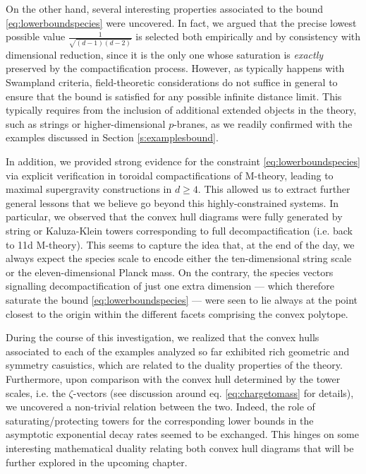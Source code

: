 On the other hand, several interesting properties associated to the bound \eqref{eq:lowerboundspecies} were uncovered. In fact, we argued that the precise lowest possible value $ \frac{1}{\sqrt{(d-1)(d-2)}}$ is selected both empirically and by consistency with dimensional reduction, since it is the only one whose saturation is \emph{exactly} preserved by the compactification process. However, as typically happens with Swampland criteria, field-theoretic considerations do not suffice in general to ensure that the bound is satisfied for any possible infinite distance limit. This typically requires from the inclusion of additional extended objects in the theory, such as strings or higher-dimensional $p$-branes, as we readily confirmed with the examples discussed in Section \ref{s:examplesbound}.

In addition, we provided strong evidence for the constraint \eqref{eq:lowerboundspecies} via explicit verification in toroidal compactifications of M-theory, leading to maximal supergravity constructions in $d \geq 4$. This allowed us to extract further general lessons that we believe go beyond this highly-constrained systems. In particular, we observed that the convex hull diagrams were fully generated by string or Kaluza-Klein towers corresponding to full decompactification (i.e. back to 11d M-theory). This seems to capture the idea that, at the end of the day, we always expect the species scale to encode either the ten-dimensional string scale or the eleven-dimensional Planck mass. On the contrary, the species vectors signalling decompactification of just one extra dimension --- which therefore saturate the bound \eqref{eq:lowerboundspecies} --- were seen to lie always at the point closest to the origin within the different facets comprising the convex polytope. 

During the course of this investigation, we realized that the convex hulls associated to each of the examples analyzed so far exhibited rich geometric and symmetry casuistics, which are related to the duality properties of the theory. Furthermore, upon comparison with the convex hull determined by the tower scales, i.e. the $\zeta$-vectors (see discussion around eq. \eqref{eq:chargetomass} for details), we uncovered a non-trivial relation between the two. Indeed, the role of saturating/protecting towers for the corresponding lower bounds in the asymptotic exponential decay rates seemed to be exchanged. This hinges on some interesting mathematical duality relating both convex hull diagrams that will be further explored in the upcoming chapter.

